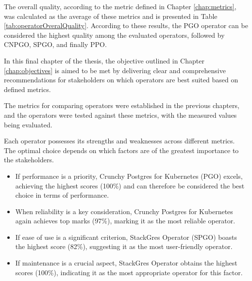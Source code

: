 

The overall quality, according to the metric defined in Chapter \ref{chap:metrics}, was calculated as the average of these metrics and is presented in Table \ref{tab:operatorOveralQuality}.
According to these results, the PGO operator can be considered the highest quality among the evaluated operators, followed by CNPGO, SPGO, and finally PPO.





In this final chapter of the thesis, the objective outlined in Chapter \ref{chap:objectives} is aimed to be met by delivering clear and comprehensive recommendations for stakeholders on which operators are best suited based on defined metrics.

The metrics for comparing operators were established in the previous chapters, and the operators were tested against these metrics, with the measured values being evaluated.

Each operator possesses its strengths and weaknesses across different metrics. The optimal choice depends on which factors are of the greatest importance to the stakeholders.

\begin{itemize}
    \item If performance is a priority, Crunchy Postgres for Kubernetes (PGO) excels, achieving the highest scores (100\%) and can therefore be considered the best choice in terms of performance.
    \item When reliability is a key consideration, Crunchy Postgres for Kubernetes again achieves top marks (97\%), marking it as the most reliable operator.
    \item If ease of use is a significant criterion, StackGres Operator (SPGO) boasts the highest score (82\%), suggesting it as the most user-friendly operator.
    \item If maintenance is a crucial aspect, StackGres Operator obtains the highest scores (100\%), indicating it as the most appropriate operator for this factor.
\end{itemize}

